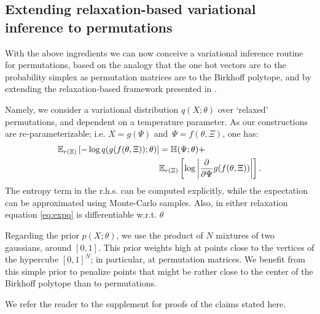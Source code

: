 \documentclass[twoside]{article}
\begin{document}
\subsection{Extending relaxation-based variational inference to permutations}
\label{sec:gumbel-softmax}
With the above ingredients we can now conceive a variational inference routine for permutations, based on the analogy that the one hot vectors are to the probability simplex as permutation matrices are to the Birkhoff polytope, and by extending the relaxation-based framework presented in \cite{maddison2016concrete}.

Namely, we consider a variational distribution $q(X;\theta)$ over `relaxed' permutations, and dependent on a temperature parameter. As our constructions are re-parameterizable; i.e.  ${X = g(\Psi)}$ and~${\Psi = f(\theta,
  \Xi)}$, one has:
  \begin{align}
  \label{eq:expq}
  \mathbb{E}_{r(\Xi)} \left[- \log q(g(f(\theta, \Xi)); \theta) \right]
  &= \mathbb{H}(\Psi; \theta)+ \\
 \nonumber  & \mathbb{E}_{r(\Xi)}\left[\log \left|\frac{\partial}{\partial \Psi} g(f(\theta, \Xi)) \right| \right].
  \end{align}
The entropy term in the r.h.s. can be computed explicitly, while the expectation can be approximated using Monte-Carlo samples. Also, in either relaxation equation \ref{eq:expq} is differentiable w.r.t. $\theta$

Regarding the prior $p(X;\theta)$, we use the product of $N$ mixtures of two gaussians, around $[0,1]$. This prior weights high at points close to the vertices of the hypercube $[0,1]^N$; in particular, at permutation matrices. We benefit from this simple prior to penalize points that might be rather close to the center of the Birkhoff polytope than to permutations.

We refer the reader to the supplement for proofs of the claims stated here.


\end{document}
